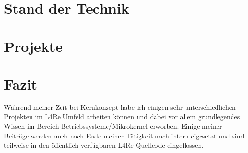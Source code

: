 \documentclass[ngerman]{tudscrreprt}
\begin{document}
\chapter{Stand der Technik}
\label{ch:background}






\chapter{Projekte}
\label{ch:projects}






\chapter{Fazit}
\label{ch:conclusion}

Während meiner Zeit bei Kernkonzept habe ich einigen sehr unterschiedlichen
Projekten im L4Re Umfeld arbeiten können und dabei vor allem grundlegendes
Wissen im Bereich Betriebssysteme/Mikrokernel erworben. Einige meiner Beiträge
werden auch nach Ende meiner Tätigkeit noch intern eigesetzt und sind teilweise
in den öffentlich verfügbaren L4Re Quellcode eingeflossen.

\newpage



\end{document}
